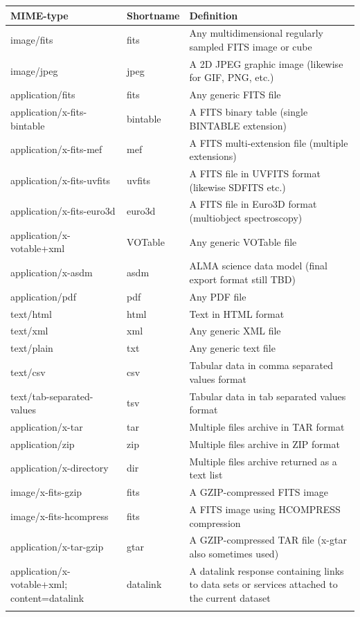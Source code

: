 \documentclass[11pt,a4paper]{ivoa}
\begin{document}
\begin{tabularx}{\textwidth}{|p{}|p{}|p{}|}
\hline
MIME-type & Shortname & Definition\\\hline
image/fits   & fits & Any multidimensional regularly sampled FITS image or cube\\\hline
image/jpeg   & jpeg & A 2D JPEG graphic image (likewise for GIF, PNG, etc.)\\\hline
application/fits & fits & Any generic FITS file\\\hline
application/x-fits-bintable & bintable & A FITS binary table (single BINTABLE extension)\\\hline
application/x-fits-mef & mef & A FITS multi-extension file (multiple extensions)\\\hline
application/x-fits-uvfits & uvfits & A FITS file in UVFITS format (likewise SDFITS etc.)\\\hline
application/x-fits-euro3d & euro3d & A FITS file in Euro3D format (multiobject spectroscopy)\\\hline
application/x-votable+xml & VOTable & Any generic VOTable file\\\hline
application/x-asdm  & asdm & ALMA science data model (final export format still TBD)\\\hline
application/pdf & pdf & Any PDF file\\\hline
text/html   & html & Text in HTML format\\\hline
text/xml & xml & Any generic XML file\\\hline
text/plain & txt & Any generic text file\\\hline
text/csv & csv & Tabular data in comma separated values format\\\hline
text/tab-separated-values & tsv & Tabular data in tab separated values format\\\hline
application/x-tar & tar & Multiple files archive in TAR format\\\hline
application/zip & zip & Multiple files archive in ZIP format\\\hline
application/x-directory & dir & Multiple files archive returned as a text list \\\hline
image/x-fits-gzip & fits & A GZIP-compressed FITS image\\\hline
image/x-fits-hcompress & fits & A FITS image using HCOMPRESS compression\\\hline
application/x-tar-gzip & gtar & A GZIP-compressed TAR file (x-gtar also sometimes used)\\\hline
application/x-votable+xml; content=datalink & datalink & A datalink response containing links to  data sets or services attached to the current dataset\\\hline
\caption{Common astronomical file formats.}
\label{tab:5}
\end{tabularx}
\end{document}
